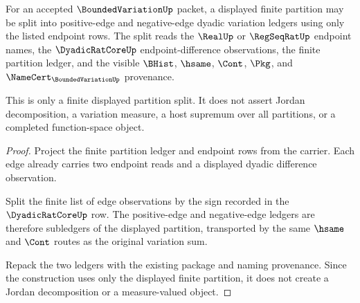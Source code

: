 \begin{theorem}
\label{thm:bounded-variation-jordan-finite-split-scope}
For an accepted $\BoundedVariationUp$ packet, a displayed finite partition may be split into positive-edge and negative-edge dyadic variation ledgers using only the listed endpoint rows. The split reads the $\RealUp$ or $\RegSeqRatUp$ endpoint names, the $\DyadicRatCoreUp$ endpoint-difference observations, the finite partition ledger, and the visible $\BHist$, $\hsame$, $\Cont$, $\Pkg$, and $\NameCert_{\BoundedVariationUp}$ provenance.

This is only a finite displayed partition split. It does not assert Jordan decomposition, a variation measure, a host supremum over all partitions, or a completed function-space object.
\end{theorem}
\begin{proof}
Project the finite partition ledger and endpoint rows from the carrier. Each edge already carries two endpoint reads and a displayed dyadic difference observation.

Split the finite list of edge observations by the sign recorded in the $\DyadicRatCoreUp$ row. The positive-edge and negative-edge ledgers are therefore subledgers of the displayed partition, transported by the same $\hsame$ and $\Cont$ routes as the original variation sum.

Repack the two ledgers with the existing package and naming provenance. Since the construction uses only the displayed finite partition, it does not create a Jordan decomposition or a measure-valued object.
\end{proof}

